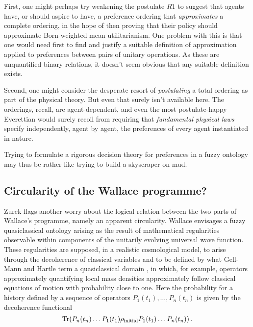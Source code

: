 \documentclass[aps,
pra,epsfig]{revtex4}
\def\Tr{{\rm{Tr}}}
\begin{document}
First, one might perhaps try weakening the postulate $R1$ to suggest that agents
have, or should aspire to have, a preference ordering that 
{\it approximates} a complete ordering, in the hope of then proving that
their policy should approximate Born-weighted mean
utilitarianism.  One problem with this is that one would need first
to find and justify a suitable definition of approximation applied to
preferences between pairs of unitary operations.   As these
are unquantified binary relations, it doesn't seem obvious that any
suitable definition exists. 

Second, one might consider the desperate resort of {\it postulating} 
a total ordering as part of the physical theory.  But even that surely 
isn't available here.  The orderings, recall, are
agent-dependent, and even the most postulate-happy Everettian would surely
recoil from requiring that {\it fundamental physical laws} specify 
independently, agent by agent, the preferences of every agent 
instantiated in nature.   

Trying to formulate a rigorous decision theory for preferences in a 
fuzzy ontology may thus be rather like trying to build a skyscraper on 
mud.  

\subsection{Circularity of the Wallace programme?} 

Zurek\cite{zurekvol} flags another worry about the
logical relation between the two parts\cite{wallacevolone,wallacevoltwo}
of Wallace's programme, namely an apparent circularity.   
Wallace envisages a fuzzy quasiclassical ontology
arising as the result of mathematical regularities observable within
components of the unitarily evolving universal wave function.  
These regularities are supposed, in a realistic cosmological model,
to arise through the decoherence of classical variables and to be
defined by what Gell-Mann and Hartle term a quasiclassical 
domain \cite{hartlevol}, in which, for example, operators
approximately quantifying local mass densities approximately 
follow classical equations of motion with probability close to one.   
Here the probability for a history defined by a sequence of 
operators $P_1 (t_1) , \ldots , P_n (t_n )$ is given by the 
decoherence functional
\begin{equation}
\Tr ( P_n (t_n ) \ldots P_1 (t_1 ) \rho_{{\rm initial}} P_1 (t_1 ) \ldots
P_n (t_n ) ) \, . 
\end{equation}
\end{document}
